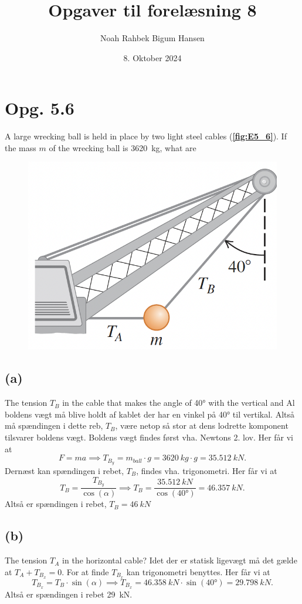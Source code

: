 \documentclass[12pt]{article}
\title{Opgaver til forelæsning 8}
\author{Noah Rahbek Bigum Hansen}
\date{8. Oktober 2024}
\begin{document}
\maketitle

\section*{Opg. 5.6}
A large wrecking ball is held in place by two light steel cables (\textbf{\autoref{fig:E5_6}}). If the mass $m$ of the wrecking ball is \qty{3620}{kg}, what are

\begin{figure} [ht]
  \centering
  \caption{}
  \includegraphics[width=0.5\linewidth]{../figures/E5_6.png}
  \label{fig:E5_6}
\end{figure}

\subsection*{(a)}
The tension $T_B$ in the cable that makes the angle of \ang{40} with the vertical and
\bigbreak
Al boldens vægt må blive holdt af kablet der har en vinkel på \ang{40} til vertikal. Altså må spændingen i dette reb, $T_B$, være netop så stor at dens lodrette komponent tilsvarer boldens vægt. Boldens vægt findes først vha. Newtons 2. lov. Her får vi at
 \[
F = ma \implies T_{B_y} = m_{ball}\cdot g = \qty{3620}{kg}\cdot g = \qty{35,512}{kN}
.\] 
Dernæst kan spændingen i rebet, $T_B$, findes vha. trigonometri. Her får vi at
 \[
T_B = \frac{T_{B_y}}{\cos(\alpha)} \implies T_B = \frac{\qty{35,512}{kN}}{\cos( \ang{40})} = \qty{46,357}{kN}
.\] 
Altså er spændingen i rebet, $T_B = \qty{46}{kN}$

\subsection*{(b)}
The tension $T_A$ in the horizontal cable?
\bigbreak
Idet der er statisk ligevægt må det gælde at $T_A + T_{B_x} = 0$. For at finde $T_{B_x}$ kan trigonometri benyttes. Her får vi at
\[
T_{B_x} = T_B \cdot \sin(\alpha) \implies T_{B_x} = \qty{46,358}{kN} \cdot \sin( \ang{40}) = \qty{29,798}{kN}
.\] 
Altså er spændingen i rebet \qty{29}{kN}.
\end{document}
